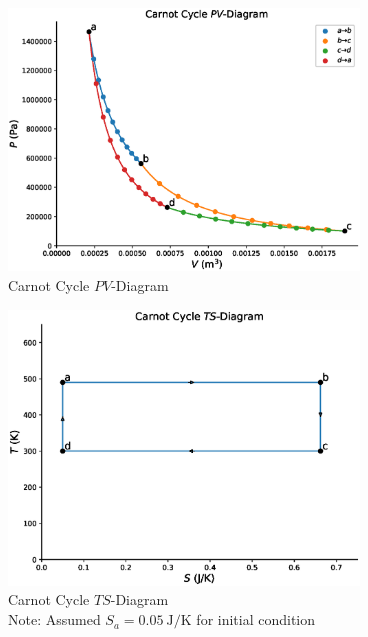 \documentclass[12pt]{iopart} %
\gdef\units#1{~\mathrm{#1}}
\begin{document}
\begin{figure}[htbp]
  \begin{indented}
  \item[]\includegraphics[width=0.83\textwidth]{pv-diagram-carnot-cycle.eps}
  \end{indented}
  \caption{\label{fig:pv_diagram}
  Carnot Cycle $PV$-Diagram
  }
\end{figure}

\begin{figure}[htbp]
  \begin{indented}
  \item[]\includegraphics[width=0.83\textwidth]{ts-diagram-carnot-cycle.eps}
  \end{indented}
  \caption{\label{fig:ts_diagram}
  Carnot Cycle $TS$-Diagram \\
  Note: Assumed $S_a = 0.05 \units{J/K}$ for initial condition
  }
\end{figure}
\end{document}
